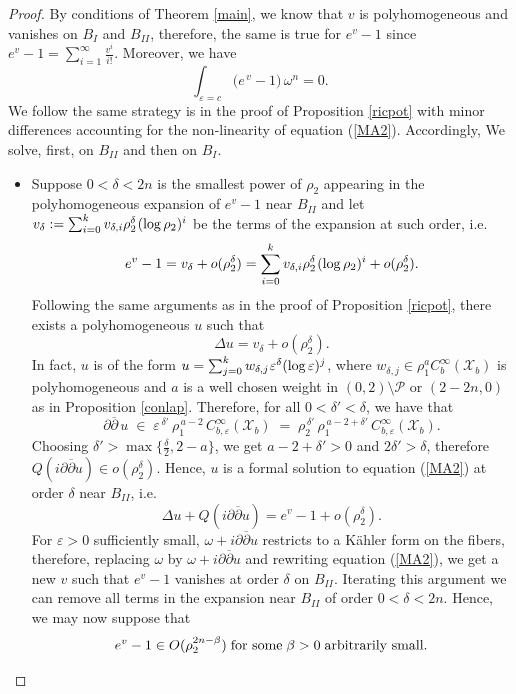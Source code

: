 \documentclass[a4paper,11pt]{article}
\begin{document}
\begin{proof}
    By conditions of Theorem \ref{main}, we know that $v$ is polyhomogeneous and vanishes on $B_{I}$ and $B_{II}$, therefore, the same is true for $e^v -1$ since $e^v -1 = \sum_{i=1}^{\infty} \frac{v^i}{i !}$. Moreover, we have 
    $$
\int_{\varepsilon = c} 
\bigl(e^{\,v}-1\bigr)\,\omega^n = 0.
$$
We follow the same strategy is in the proof of Proposition \ref{ricpot} with minor differences accounting for the non-linearity of equation (\ref{MA2}). Accordingly, We solve, first, on $B_{II}$ and then on $B_{I}$.
    \begin{itemize}
        \item 
        Suppose $0< \delta < 2n$ is the smallest power of $\rho_2$ appearing in the polyhomogeneous expansion of $e^v -1$ near $B_{II}$ and let $ v_\delta :=  \sum_{i=0}^k v_{\delta, i} \rho_2^{\delta}\hspace{0.03cm}(\log \rho_2)^i$ be the terms of the expansion at such order, i.e.
        $$
        e^v -1 = v_\delta + o(\rho_2^\delta) =   \sum_{i=0}^k v_{\delta, i} \rho_2^{\delta}\hspace{0.03cm}(\log \rho_2)^i + o(\rho_2^\delta).
        $$
Following the same arguments as in the proof of Proposition \ref{ricpot}, there exists a polyhomogeneous $u$ such that
$$ \Delta u = v_\delta + o(\rho_2^{\delta}).$$ 
In fact, $u$ is of the form $u=\sum_{j=0}^k w_{\delta,j} \hspace{0.02cm} \varepsilon^\delta (\log \varepsilon)^j$, where $w_{\delta,j} \in \rho_1^{a} C^\infty_b(\mathcal{X}_b)$ is polyhomogeneous and $a$ is a well chosen weight in $(0,2) \setminus \mathcal{P}$ or $(2-2n,0)$ as in Proposition \ref{conlap}. Therefore, for all $0<\delta'< \delta$, we have that 
$$
\partial\overline{\partial}\,u \;\in\; \varepsilon^{\,\delta'}\,\rho_{1}^{\,a-2}\,C_{b,\varepsilon}^{\infty} (\mathcal{X}_b)
\;=\;
\rho_{2}^{\,\delta'}\,\rho_{1}^{\,a-2+ \delta'}\,C_{b,\varepsilon}^{\infty}(\mathcal{X}_b).
$$
Choosing $ \delta' > \max \{ \frac{\delta}{2}, 2 -a \}$, we get $a-2+ \delta' > 0$ and $2\delta' > \delta$, therefore $Q(i \partial \overline{\partial} u) \in o ( \rho_2^\delta)$. Hence, $u$ is a formal solution to equation (\ref{MA2}) at order $\delta$ near $B_{II}$, i.e.
$$
\Delta u + Q(i \partial \overline{\partial}u) = e^v -1 + o(\rho_2^\delta). 
$$
For $\varepsilon>0$ sufficiently small, $\omega + i \partial \overline{\partial} u $ restricts to a Kähler form on the fibers, therefore, replacing $\omega$ by $\omega + i \partial \overline{\partial} u $ and rewriting equation (\ref{MA2}), we get a new $v$ such that $e^v - 1$ vanishes at order $\delta$ on $B_{II}$. Iterating this argument we can remove all terms in the expansion near $B_{II}$ of order $0< \delta < 2n$. Hence, we may now suppose that 
$$
e^v -1 \in O(\rho_2^{2n - \beta}) \hspace{0.1cm}\text{for some}\;\beta>0\;\text{arbitrarily small}.
$$ 


\end{itemize}
\end{proof}
\end{document}
